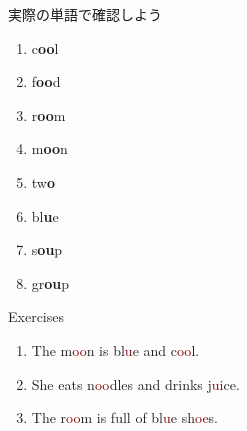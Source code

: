 \documentclass[aspectratio=169,xcolor={dvipsnames,table}]{beamer}
\begin{document}
\begin{frame}[plain]{実際の単語で確認しよう}
\LARGE

\begin{enumerate}
 \item c\textcolor{NavyBlue}{\bfseries oo}l%
\hfill{}\hspace{150pt}\mbox{}
 \item f\textcolor{NavyBlue}{\bfseries oo}d%
\hfill{}\hspace{150pt}\mbox{}
\item r\textcolor{NavyBlue}{\bfseries oo}m%
\hfill{}\hspace{150pt}\mbox{}
 \item m\textcolor{NavyBlue}{\bfseries oo}n%
\hfill{}\hspace{150pt}\mbox{}
 \item tw\textcolor{NavyBlue}{\bfseries o}%
\hfill{}\hspace{150pt}\mbox{}
 \item bl\textcolor{NavyBlue}{\bfseries u}e%
\hfill{}\hspace{150pt}\mbox{} 
 \item s\textcolor{NavyBlue}{\bfseries ou}p%
\hfill{}\hspace{150pt}\mbox{}
 \item gr\textcolor{NavyBlue}{\bfseries ou}p%
\hfill{}\hspace{150pt}\mbox{}
\end{enumerate}
\end{frame}
\begin{frame}[plain]{Exercises}
\LARGE
\begin{enumerate}
 \item The m\textcolor{Maroon}{oo}n is bl\textcolor{Maroon}{u}e and c\textcolor{Maroon}{oo}l.
 \item She eats n\textcolor{Maroon}{oo}dles and drinks j\textcolor{Maroon}{ui}ce.
 \item The r\textcolor{Maroon}{oo}m is full of bl\textcolor{Maroon}{u}e sh\textcolor{Maroon}{oe}s.

\end{enumerate}
\end{frame}
\end{document}
